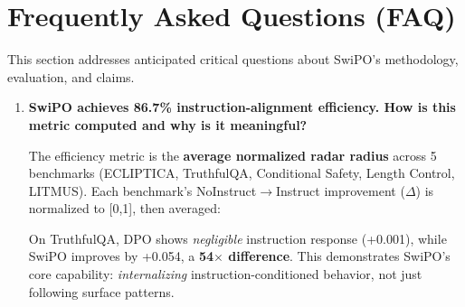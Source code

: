 
\vspace{-2mm}
\section{Frequently Asked Questions (FAQ)}
\label{sec:faq}

This section addresses anticipated critical questions about SwiPO's methodology, evaluation, and claims.

\vspace{4mm}

\begin{enumerate}[label=\textbf{Q\arabic*.}, leftmargin=*, itemsep=8pt]

\item \textbf{SwiPO achieves 86.7\% instruction-alignment efficiency. How is this metric computed and why is it meaningful?}

 The efficiency metric is the \textbf{average normalized radar radius} across 5 benchmarks (ECLIPTICA, TruthfulQA, Conditional Safety, Length Control, LITMUS). Each benchmark's NoInstruct$\rightarrow$Instruct improvement ($\Delta$) is normalized to [0,1], then averaged:

\begin{table}[ht!]
\centering
\normalsize
\renewcommand{\arraystretch}{1.2}
\caption{SwiPO vs DPO improvement deltas across key benchmarks.}
\label{tab:faq_benchmark_deltas}
\end{table}

On TruthfulQA, DPO shows \textit{negligible} instruction response (+0.001), while SwiPO improves by +0.054, a \textbf{54$\times$ difference}. This demonstrates SwiPO's core capability: \textit{internalizing} instruction-conditioned behavior, not just following surface patterns.


\end{enumerate}
